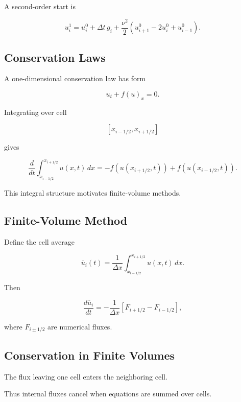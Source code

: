 A second-order start is

\[
\boxed{
u_i^1
=
u_i^0
+
\Delta t\,g_i
+
\frac{\nu^2}{2}
\left(
u_{i+1}^0
-
2u_i^0
+
u_{i-1}^0
\right).
}
\]

\subsection{Conservation Laws}
\label{subsec:numerical-conservation-laws}

A one-dimensional conservation law has form

\[
\boxed{
u_t
+
f(u)_x
=
0.
}
\]

Integrating over cell

\[
[x_{i-1/2},x_{i+1/2}]
\]

gives

\[
\boxed{
\frac{d}{dt}
\int_{x_{i-1/2}}^{x_{i+1/2}}
u(x,t)\,dx
=
-
f(u(x_{i+1/2},t))
+
f(u(x_{i-1/2},t)).
}
\]

This integral structure motivates finite-volume methods.

\subsection{Finite-Volume Method}
\label{subsec:finite-volume-method}

Define the cell average

\[
\boxed{
\overline{u}_i(t)
=
\frac1{\Delta x}
\int_{x_{i-1/2}}^{x_{i+1/2}}
u(x,t)\,dx.
}
\]

Then

\[
\boxed{
\frac{d\overline{u}_i}{dt}
=
-
\frac1{\Delta x}
\left[
F_{i+1/2}
-
F_{i-1/2}
\right],
}
\]

where \(F_{i\pm1/2}\) are numerical fluxes.

\subsection{Conservation in Finite Volumes}
\label{subsec:finite-volume-conservation}

The flux leaving one cell enters the neighboring cell.

Thus internal fluxes cancel when equations are summed over cells.

